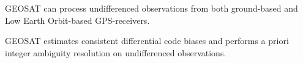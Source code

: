 \settowidth{\hangindent}{GEOSAT }
GEOSAT can process undifferenced observations from both ground-based
and Low Earth Orbit-based GPS-receivers.

\settowidth{\hangindent}{GEOSAT }
GEOSAT estimates consistent differential code biases and performs a
priori integer ambiguity resolution on undifferenced observations.

\endinput
